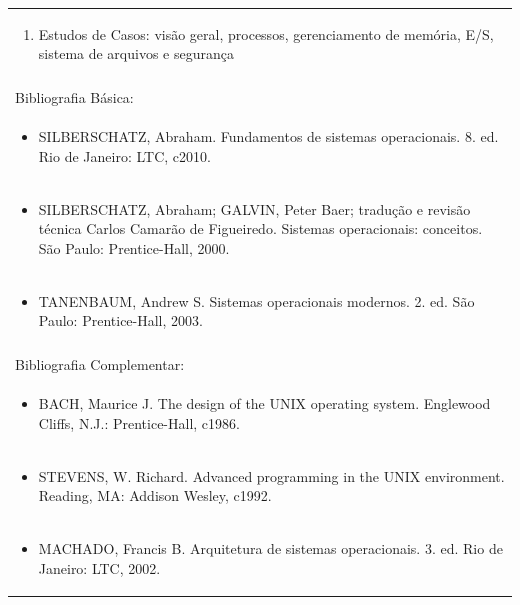\documentclass[11pt]{article}
\begin{document}
\begin{center}
\begin{longtable}{|p{4cm}|p{4cm}|p{4cm}|p{4cm}|}
\multicolumn{4}{|p{\dimexpr 16cm + 6\tabcolsep\relax}|}{\begin{enumerate}[start=7]\item Estudos de Casos: visão geral, processos, gerenciamento de memória, E/S, sistema de arquivos e segurança\end{enumerate}}\\
\multicolumn{4}{|p{\dimexpr 16cm + 6\tabcolsep\relax}|}{}\\
\hline
\multicolumn{4}{|p{16cm}|}{Bibliografia Básica:}\\*
\multicolumn{4}{|p{\dimexpr 16cm + 6\tabcolsep\relax}|}{\begin{itemize}\item SILBERSCHATZ, Abraham. Fundamentos de sistemas operacionais. 8. ed. Rio de Janeiro: LTC, c2010.\end{itemize}}\\
\multicolumn{4}{|p{\dimexpr 16cm + 6\tabcolsep\relax}|}{\begin{itemize}\item SILBERSCHATZ, Abraham; GALVIN, Peter Baer; tradução e revisão técnica Carlos Camarão de Figueiredo. Sistemas operacionais: conceitos. São Paulo: Prentice-Hall, 2000.\end{itemize}}\\
\multicolumn{4}{|p{\dimexpr 16cm + 6\tabcolsep\relax}|}{\begin{itemize}\item TANENBAUM, Andrew S. Sistemas operacionais modernos. 2. ed. São Paulo: Prentice-Hall, 2003.\end{itemize}}\\
\multicolumn{4}{|p{16cm}|}{}\\
\hline
\multicolumn{4}{|p{16cm}|}{Bibliografia Complementar:}\\*
\multicolumn{4}{|p{\dimexpr 16cm + 6\tabcolsep\relax}|}{\begin{itemize}\item BACH, Maurice J. The design of the UNIX operating system. Englewood Cliffs, N.J.: Prentice-Hall, c1986.\end{itemize}}\\
\multicolumn{4}{|p{\dimexpr 16cm + 6\tabcolsep\relax}|}{\begin{itemize}\item STEVENS, W. Richard. Advanced programming in the UNIX environment. Reading, MA: Addison Wesley, c1992.\end{itemize}}\\
\multicolumn{4}{|p{\dimexpr 16cm + 6\tabcolsep\relax}|}{\begin{itemize}\item MACHADO, Francis B. Arquitetura de sistemas operacionais. 3. ed. Rio de Janeiro: LTC, 2002.\end{itemize}}\\

\end{longtable}
\end{center}
\end{document}
